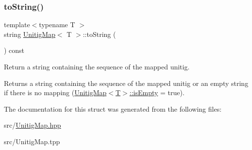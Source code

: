 \subsubsection{\texorpdfstring{to\+String()}{toString()}}
{\footnotesize\ttfamily template$<$typename T $>$ \\
string \hyperlink{structUnitigMap}{Unitig\+Map}$<$ T $>$\+::to\+String (\begin{DoxyParamCaption}{ }\end{DoxyParamCaption}) const}



Return a string containing the sequence of the mapped unitig. 

\begin{DoxyReturn}{Returns}
a string containing the sequence of the mapped unitig or an empty string if there is no mapping (\hyperlink{structUnitigMap_a152c942911cb2ccf57d4c4c1e3f40178}{Unitig\+Map$<$\+T$>$\+::is\+Empty} = true). 
\end{DoxyReturn}


The documentation for this struct was generated from the following files\+:\begin{DoxyCompactItemize}
\item 
src/\hyperlink{UnitigMap_8hpp}{Unitig\+Map.\+hpp}\item 
src/Unitig\+Map.\+tpp\end{DoxyCompactItemize}
